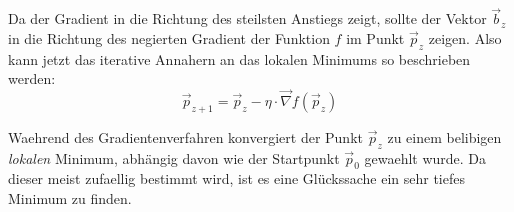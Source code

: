 \documentclass[../main]{subfiles}
\begin{document}
\noindent {}

Da der Gradient in die Richtung des steilsten Anstiegs zeigt, sollte der Vektor $\vec{b}_z$ in die Richtung des negierten Gradient der Funktion $f$ im Punkt $\vec{p}_z$ zeigen.
Also kann jetzt das iterative Annahern an das lokalen Minimums so beschrieben werden:\\
\begin{equation}\label{eq:gradientdescent}
    \vec{p}_{z+1} = \vec{p}_z - \eta \cdot \vec{\nabla} \mathit{f}(\vec{p}_z)
\end{equation}

Waehrend des Gradientenverfahren konvergiert der Punkt $\vec{p}_z$ zu einem belibigen \textit{lokalen} Minimum, abhängig davon wie der Startpunkt $\vec{p}_0$ gewaehlt wurde.
Da dieser meist zufaellig bestimmt wird, ist es eine Glückssache ein sehr tiefes Minimum zu finden.
\end{document}
